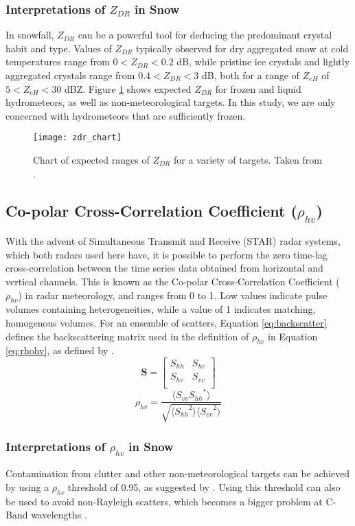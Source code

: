 \subsubsection{Interpretations of $Z_{DR}$ in Snow}
In snowfall, $Z_{DR}$ can be a powerful tool for deducing the predominant crystal habit and type. Values of $Z_{DR}$ typically observed for dry aggregated snow at cold temperatures range from $0 < Z_{DR} < 0.2$ dB, while pristine ice crystals and lightly aggregated crystals range from $0.4 < Z_{DR} < 3$ dB, both for a range of $Z_{eH}$ of $5 < Z_{eH} < 30$ dBZ. Figure \ref{zdr_chart} shows expected $Z_{DR}$ for frozen and liquid hydrometeors, as well as non-meteorological targets. In this study, we are only concerned with hydrometeors that are sufficiently frozen.
\begin{figure}[H]
\texttt{[image: zdr\_chart]}
\caption{Chart of expected ranges of $Z_{DR}$ for a variety of targets. Taken from \citet{Fabry2015}.} 
\label{zdr_chart}
\end{figure}
\subsection{Co-polar Cross-Correlation Coefficient ($\rho_{hv}$)}
With the advent of Simultaneous Transmit and Receive (STAR) radar systems, which both radars used here have, it is possible to perform the zero time-lag
cross-correlation between the time series data obtained from horizontal and vertical channels. This is known as the Co-polar Cross-Correlation Coefficient
($\rho_{hv}$) in radar meteorology, and ranges from 0 to 1. Low values indicate pulse volumes containing heterogeneities, while a value of 1 indicates
matching, homogenous volumes. For an ensemble of scatters, Equation \ref{eq:backscatter} defines the backscattering matrix used in the definition of
$\rho_{hv}$ in Equation \ref{eq:rhohv}, as defined by \citet{Ryzhkov2007b}.
\begin{equation}\label{eq:backscatter}
\mathbf{S} = \begin{bmatrix}
             S_{hh}       & S_{hv} \\
             S_{hv}       & S_{vv} \\
             \end{bmatrix}
\end{equation}
\begin{equation}\label{eq:rhohv}
\rho_{hv} = \frac{\langle{S_{vv}{S_{hh}}^{*}\rangle}}{\sqrt{\langle{{S_{hh}}^{2}\rangle}\langle{{S_{vv}}^{2}\rangle}}}
\end{equation}
\subsubsection{Interpretations of $\rho_{hv}$ in Snow}
Contamination from clutter and other non-meteorological targets can be achieved by using a $\rho_{hv}$ threshold of 0.95, as suggested by \citet{Straka2000}.
Using this threshold can also be used to avoid non-Rayleigh scatters, which becomes a bigger problem at C-Band wavelengths \citet{Fabry2015}.
 




